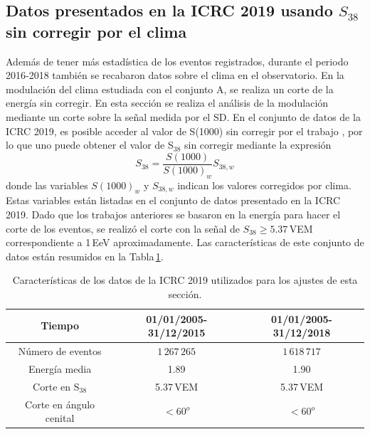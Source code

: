 \subsection{Datos presentados en la ICRC 2019 usando $S_{38}$ sin corregir por el clima} \label{sin_corregir_s38}

Además de tener más estadística de los eventos registrados, durante el periodo 2016-2018 también se recabaron datos sobre el clima en el observatorio. En la modulación del clima estudiada con el conjunto A, se  realiza un corte de la energía sin corregir. En esta sección se realiza el análisis de la modulación mediante un  corte sobre la señal medida por el SD. En el conjunto de datos de la ICRC 2019, es posible acceder al valor de S(1000) sin corregir por el trabajo \cite{aab2017impact}, por lo que uno puede obtener el valor de S$_{38}$ sin corregir mediante la expresión
\begin{equation}
    S_{38} = \frac{S(1000)}{S(1000)_w}S_{38,w}
    \label{eq:s38_w}
\end{equation}
donde las variables $S(1000)_w$ y $S_{38,w}$ indican los valores corregidos por clima. Estas variables están listadas en el conjunto de datos presentado en la ICRC 2019. Dado que los trabajos anteriores se basaron en la energía para hacer el corte de los eventos, se realizó el corte con la señal de $S_{38}\ge 5.37\,$VEM correspondiente a 1\,EeV aproximadamente. Las características de este conjunto de datos están resumidos en la Tabla\,\ref{tabla:caracteristicas_ICRC_2019_S38}.
        \begin{table}[H]
            \centering
            \begin{tabular}{c|c|c}
            \textbf{Tiempo }    & \textbf{01/01/2005-31/12/2015}  & \textbf{01/01/2005-31/12/2018 }\\ \hline 
            Número de eventos       &   $1\,267\,265$     		 &  $1\,618\,717$     		\\ \hline 
            Energía media           &  1.89        		 	 &  1.90        		\\ \hline 
            Corte en S$_{38}$ 	    &  5.37\,VEM   		 	 &  5.37\,VEM       	\\ \hline 
            Corte en ángulo cenital 		&  $<60^o$ 			 	 & $<60^o$\\ 
            \end{tabular}
            \caption{Características de los datos de la ICRC 2019 utilizados para los ajustes de esta sección.} \label{tabla:caracteristicas_ICRC_2019_S38}
        \end{table}

